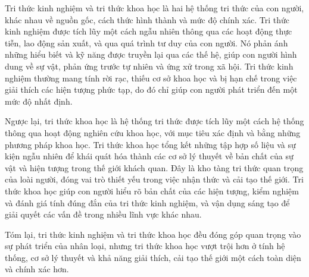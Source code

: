 Tri thức kinh nghiệm và tri thức khoa học là hai hệ thống tri thức của con người, khác nhau về nguồn gốc, cách thức hình thành và mức độ chính xác. Tri thức kinh nghiệm được tích lũy một cách ngẫu nhiên thông qua các hoạt động thực tiễn, lao động sản xuất, và qua quá trình tư duy của con người. Nó phản ánh những hiểu biết và kỹ năng được truyền lại qua các thế hệ, giúp con người hình dung về sự vật, phản ứng trước tự nhiên và ứng xử trong xã hội. Tri thức kinh nghiệm thường mang tính rời rạc, thiếu cơ sở khoa học và bị hạn chế trong việc giải thích các hiện tượng phức tạp, do đó chỉ giúp con người phát triển đến một mức độ nhất định.

Ngược lại, tri thức khoa học là hệ thống tri thức được tích lũy một cách hệ thống thông qua hoạt động nghiên cứu khoa học, với mục tiêu xác định và bằng những phương pháp khoa học. Tri thức khoa học tổng kết những tập hợp số liệu và sự kiện ngẫu nhiên để khái quát hóa thành các cơ sở lý thuyết về bản chất của sự vật và hiện tượng trong thế giới khách quan. Đây là kho tàng tri thức quan trọng của loài người, đóng vai trò thiết yếu trong việc nhận thức và cải tạo thế giới. Tri thức khoa học giúp con người hiểu rõ bản chất của các hiện tượng, kiểm nghiệm và đánh giá tính đúng đắn của tri thức kinh nghiệm, và vận dụng sáng tạo để giải quyết các vấn đề trong nhiều lĩnh vực khác nhau.

Tóm lại, tri thức kinh nghiệm và tri thức khoa học đều đóng góp quan trọng vào sự phát triển của nhân loại, nhưng tri thức khoa học vượt trội hơn ở tính hệ thống, cơ sở lý thuyết và khả năng giải thích, cải tạo thế giới một cách toàn diện và chính xác hơn.

